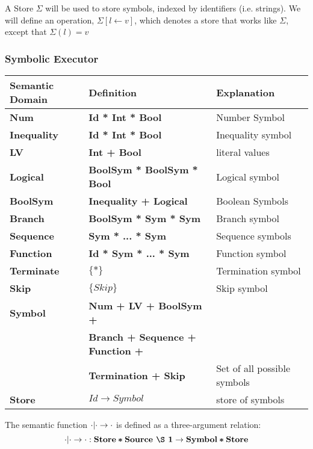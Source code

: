 A Store $\Sigma$ will be used to store symbols,
indexed by identifiers (i.e. strings). We will define an operation, $\Sigma[l\leftarrow v]$,
which denotes a store that works like $\Sigma$, except that $\Sigma(l) = v$

\subsubsection{Symbolic Executor}

\begin{center}
\begin{tabular}{|l|ll|} \hline 
Semantic Domain & Definition & Explanation\\ \hline
\textbf{Num} & \textbf{Id * Int * Bool} & Number Symbol\\
\textbf{Inequality}  & \textbf{Id * Int * Bool} & Inequality symbol\\ 
\textbf{LV}  & \textbf{Int + Bool} & literal values\\ 
\textbf{Logical}  & \textbf{BoolSym * BoolSym * Bool} & Logical symbol\\ 
\textbf{BoolSym}  & \textbf{Inequality + Logical} & Boolean Symbols\\ 
\textbf{Branch}  & \textbf{BoolSym * Sym * Sym} & Branch symbol \\ 
\textbf{Sequence}  & \textbf{Sym * ... * Sym}  & Sequence symbols \\ 
\textbf{Function}   & \textbf{Id * Sym * ... * Sym} & Function symbol \\ 
\textbf{Terminate}   & $\{*\}$ & Termination symbol \\ 
\textbf{Skip}   & $ \{Skip\}$ & Skip symbol \\
\textbf{Symbol} & \textbf{Num + LV + BoolSym + } & \\
                & \textbf{Branch + Sequence + Function +} & \\
                & \textbf{Termination + Skip}  & Set of all possible symbols \\ 
\textbf{Store} & $Id \to Symbol$ & store of symbols \\
  \hline
\end{tabular}
\end{center}


The semantic function 
$\cdot | \cdot \to \cdot$
is defined as a three-argument relation:
\[
\cdot \under \cdot \eval \cdot : 
 \textbf{Store} \boldsymbol{*} \textbf{Source \S 1} \rightarrow \textbf{Symbol} \boldsymbol{*} \textbf{Store}
\]

